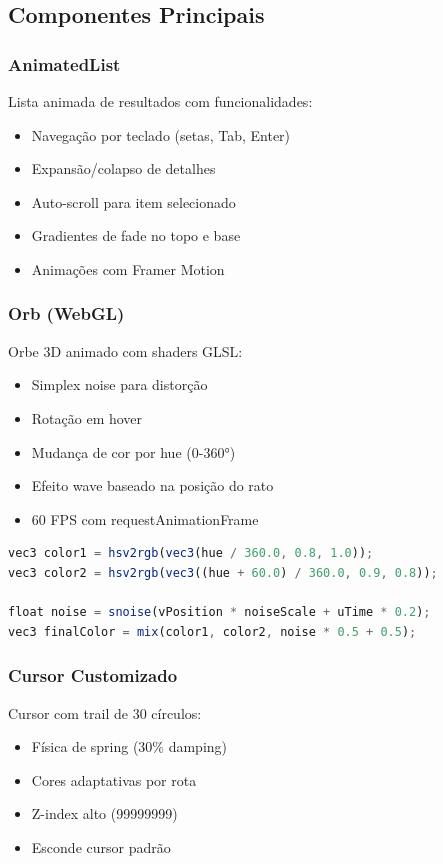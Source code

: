 \documentclass[12pt,a4paper]{article}
\begin{document}
\subsection{Componentes Principais}

\subsubsection{AnimatedList}
Lista animada de resultados com funcionalidades:
\begin{itemize}
    \item Navegação por teclado (setas, Tab, Enter)
    \item Expansão/colapso de detalhes
    \item Auto-scroll para item selecionado
    \item Gradientes de fade no topo e base
    \item Animações com Framer Motion
\end{itemize}

\subsubsection{Orb (WebGL)}
Orbe 3D animado com shaders GLSL:
\begin{itemize}
    \item Simplex noise para distorção
    \item Rotação em hover
    \item Mudança de cor por hue (0-360°)
    \item Efeito wave baseado na posição do rato
    \item 60 FPS com requestAnimationFrame
\end{itemize}

\begin{lstlisting}[language=JavaScript, caption={Shader GLSL do Orb (fragmento)}]
vec3 color1 = hsv2rgb(vec3(hue / 360.0, 0.8, 1.0));
vec3 color2 = hsv2rgb(vec3((hue + 60.0) / 360.0, 0.9, 0.8));

float noise = snoise(vPosition * noiseScale + uTime * 0.2);
vec3 finalColor = mix(color1, color2, noise * 0.5 + 0.5);
\end{lstlisting}

\subsubsection{Cursor Customizado}
Cursor com trail de 30 círculos:
\begin{itemize}
    \item Física de spring (30\% damping)
    \item Cores adaptativas por rota
    \item Z-index alto (99999999)
    \item Esconde cursor padrão
\end{itemize}
\end{document}
